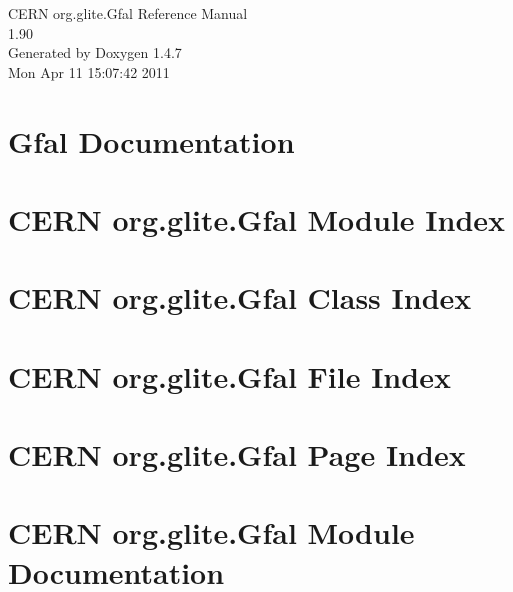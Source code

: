 \documentclass[a4paper]{book}
\begin{document}
\begin{titlepage}
\vspace*{7cm}
\begin{center}
{\Large CERN org.glite.Gfal Reference Manual\\[1ex]\large 1.90 }\\
\vspace*{1cm}
{\large Generated by Doxygen 1.4.7}\\
\vspace*{0.5cm}
{\small Mon Apr 11 15:07:42 2011}\\
\end{center}
\end{titlepage}
\clearemptydoublepage
{}
\tableofcontents
\clearemptydoublepage
{}
\chapter{Gfal Documentation }
\label{index}
\chapter{CERN org.glite.Gfal Module Index}

\chapter{CERN org.glite.Gfal Class Index}

\chapter{CERN org.glite.Gfal File Index}

\chapter{CERN org.glite.Gfal Page Index}

\chapter{CERN org.glite.Gfal Module Documentation}





\end{document}
